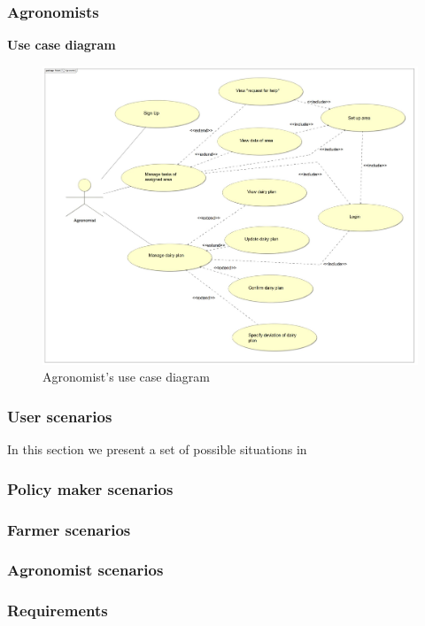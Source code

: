 \subsubsection{Agronomists}
\textbf{\textcolor{myblue}{Use case diagram}}
\begin{figure}[H]
	\centering
    \includegraphics[page=1, width=\textwidth]{Images/ud_ag.JPG}
	\caption{\label{fig:use_case_diagram}Agronomist's use case diagram}
\end{figure}
\label{sect:agronomist_requirements}


\subsubsection{User scenarios}
In this section we present a set of possible situations in 
\subsubsection{Policy maker scenarios}
\subsubsection{Farmer scenarios}

\subsubsection{Agronomist scenarios}
\subsubsection{Requirements}
